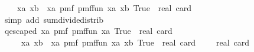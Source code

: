\begin{isabellebody}
\ \ \ \ {\isacharparenleft}{\kern0pt}{\isasymSum}xa{\isasymin}{\isacharquery}{\kern0pt}{\isasymK}{\isachardot}{\kern0pt}\ {\isacharparenleft}{\kern0pt}{\isasymSum}xb{\isasymin}{\isacharparenleft}{\kern0pt}{\isacharquery}{\kern0pt}{\isasymK}\ {\isacharminus}{\kern0pt}\ {\isacharbraceleft}{\kern0pt}xa{\isacharbraceright}{\kern0pt}{\isacharparenright}{\kern0pt}{\isachardot}{\kern0pt}\ pmf\ {\isacharparenleft}{\kern0pt}{\isacharparenleft}{\kern0pt}{\isacharquery}{\kern0pt}pmf{\isacharunderscore}{\kern0pt}fun{\isacharprime}{\kern0pt}{\isacharprime}{\kern0pt}\ xa{\isacharparenright}{\kern0pt}\ xb{\isacharparenright}{\kern0pt}\ True{\isacharparenright}{\kern0pt}{\isacharparenright}{\kern0pt}\ {\isacharslash}{\kern0pt}\ real\ {\isacharparenleft}{\kern0pt}card\ {\isacharquery}{\kern0pt}{\isasymK}\ {\isacharminus}{\kern0pt}\ {}{\isacharparenright}{\kern0pt}{\isachardoublequoteclose}\ \isanewline
\ \ \ \isamarkupfalse%
\ {\isacharparenleft}{\kern0pt}simp\ add{\isacharcolon}{\kern0pt}\ sum{\isacharunderscore}{\kern0pt}divide{\isacharunderscore}{\kern0pt}distrib{\isacharparenright}{\kern0pt}\ \ \isanewline
\isanewline
\ \ \isamarkupfalse%
\ \isamarkupfalse%
\ q{\isacharunderscore}{\kern0pt}escaped{\isacharcolon}{\kern0pt}\ {\isachardoublequoteopen}{\isacharparenleft}{\kern0pt}{\isasymSum}xa{\isasymin}{\isacharquery}{\kern0pt}{\isasymK}{\isachardot}{\kern0pt}\ pmf\ {\isacharparenleft}{\kern0pt}{\isacharquery}{\kern0pt}pmf{\isacharunderscore}{\kern0pt}fun{\isacharprime}{\kern0pt}\ xa{\isacharparenright}{\kern0pt}\ True{\isacharparenright}{\kern0pt}\ {\isacharslash}{\kern0pt}\ real\ {\isacharparenleft}{\kern0pt}card\ {\isacharquery}{\kern0pt}{\isasymK}{\isacharparenright}{\kern0pt}\ {\isacharequal}{\kern0pt}\ \isanewline
\ \ \ \ \ {\isacharparenleft}{\kern0pt}{\isasymSum}xa{\isasymin}{\isacharquery}{\kern0pt}{\isasymK}{\isachardot}{\kern0pt}\ {\isacharparenleft}{\kern0pt}{\isasymSum}xb{\isasymin}{\isacharparenleft}{\kern0pt}{\isacharquery}{\kern0pt}{\isasymK}\ {\isacharminus}{\kern0pt}\ {\isacharbraceleft}{\kern0pt}xa{\isacharbraceright}{\kern0pt}{\isacharparenright}{\kern0pt}{\isachardot}{\kern0pt}\ pmf\ {\isacharparenleft}{\kern0pt}{\isacharparenleft}{\kern0pt}{\isacharquery}{\kern0pt}pmf{\isacharunderscore}{\kern0pt}fun{\isacharprime}{\kern0pt}{\isacharprime}{\kern0pt}\ xa{\isacharparenright}{\kern0pt}\ xb{\isacharparenright}{\kern0pt}\ True{\isacharparenright}{\kern0pt}{\isacharparenright}{\kern0pt}\ {\isacharslash}{\kern0pt}\ {\isacharparenleft}{\kern0pt}real\ {\isacharparenleft}{\kern0pt}card\ {\isacharquery}{\kern0pt}{\isasymK}\ {\isacharminus}{\kern0pt}\ {}{\isacharparenright}{\kern0pt}\ {\isacharasterisk}{\kern0pt}\ real\ {\isacharparenleft}{\kern0pt}card\ {\isacharquery}{\kern0pt}{\isasymK}{\isacharparenright}{\kern0pt}{\isacharparenright}{\kern0pt}{\isachardoublequoteclose}\isanewline

\end{isabellebody}
